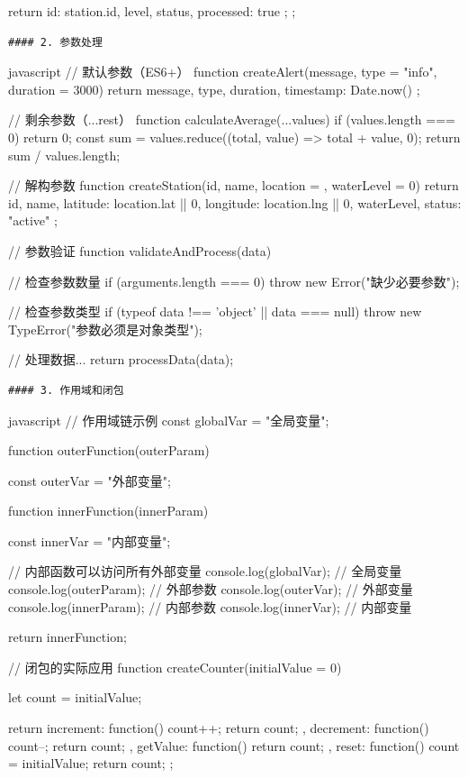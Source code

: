 {{    return {
        id: station.id,
        level,
        status,
        processed: true
    };
};
\begin{lstlisting}
#### 2. 参数处理

\end{lstlisting}javascript
// 默认参数（ES6+）
function createAlert(message, type = "info", duration = 3000) {
    return {
        message,
        type,
        duration,
        timestamp: Date.now()
    };
}

// 剩余参数（...rest）
function calculateAverage(...values) {
    if (values.length === 0) return 0;
    const sum = values.reduce((total, value) => total + value, 0);
    return sum / values.length;
}

// 解构参数
function createStation({id, name, location = {}, waterLevel = 0}) {
    return {
        id,
        name,
        latitude: location.lat || 0,
        longitude: location.lng || 0,
        waterLevel,
        status: "active"
    };
}

// 参数验证
function validateAndProcess(data) {
    // 检查参数数量
    if (arguments.length === 0) {
        throw new Error("缺少必要参数");
    }
    
    // 检查参数类型
    if (typeof data !== 'object' || data === null) {
        throw new TypeError("参数必须是对象类型");
    }
    
    // 处理数据...
    return processData(data);
}
\begin{lstlisting}
#### 3. 作用域和闭包

\end{lstlisting}javascript
// 作用域链示例
const globalVar = "全局变量";

function outerFunction(outerParam) {
    const outerVar = "外部变量";
    
    function innerFunction(innerParam) {
        const innerVar = "内部变量";
        
        // 内部函数可以访问所有外部变量
        console.log(globalVar);  // 全局变量
        console.log(outerParam); // 外部参数
        console.log(outerVar);   // 外部变量
        console.log(innerParam); // 内部参数
        console.log(innerVar);   // 内部变量
    }
    
    return innerFunction;
}

// 闭包的实际应用
function createCounter(initialValue = 0) {
    let count = initialValue;
    
    return {
        increment: function() {
            count++;
            return count;
        },
        decrement: function() {
            count--;
            return count;
        },
        getValue: function() {
            return count;
        },
        reset: function() {
            count = initialValue;
            return count;
        }
    };
}

}
